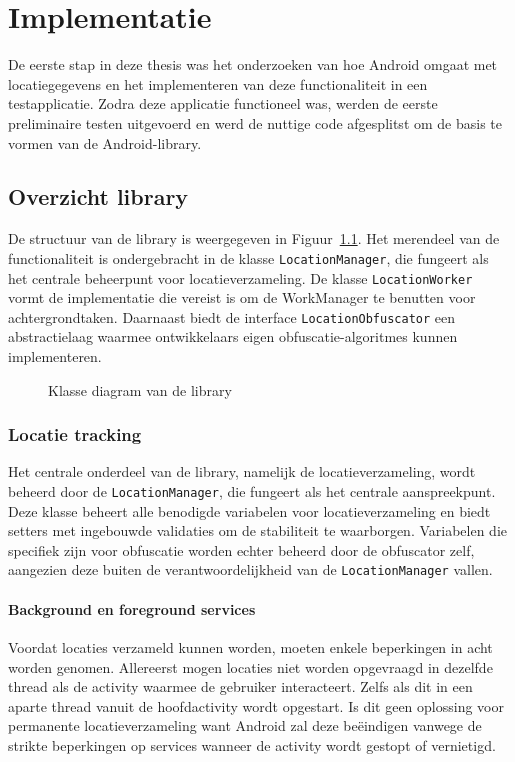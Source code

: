 \chapter{Implementatie} \label{chap:implementatie}
De eerste stap in deze thesis was het onderzoeken van hoe Android omgaat met locatiegegevens en het implementeren van deze functionaliteit in een testapplicatie. Zodra deze applicatie functioneel was, werden de eerste preliminaire testen uitgevoerd en werd de nuttige code afgesplitst om de basis te vormen van de Android-library.
\section{Overzicht library}
De structuur van de library is weergegeven in Figuur~\ref{fig:uml_library}. Het merendeel van de functionaliteit is ondergebracht in de klasse \texttt{LocationManager}, die fungeert als het centrale beheerpunt voor locatieverzameling. De klasse \texttt{LocationWorker} vormt de implementatie die vereist is om de WorkManager te benutten voor achtergrondtaken. Daarnaast biedt de interface \texttt{LocationObfuscator} een abstractielaag waarmee ontwikkelaars eigen obfuscatie-algoritmes kunnen implementeren.
\begin{figure}
    \centering
    
    \caption{Klasse diagram van de library}
    \label{fig:uml_library}
\end{figure}
\subsection{Locatie tracking}
Het centrale onderdeel van de library, namelijk de locatieverzameling, wordt beheerd door de \texttt{LocationManager}, die fungeert als het centrale aanspreekpunt. Deze klasse beheert alle benodigde variabelen voor locatieverzameling en biedt setters met ingebouwde validaties om de stabiliteit te waarborgen. Variabelen die specifiek zijn voor obfuscatie worden echter beheerd door de obfuscator zelf, aangezien deze buiten de verantwoordelijkheid van de \texttt{LocationManager} vallen.

\subsubsection{Background en foreground services}
Voordat locaties verzameld kunnen worden, moeten enkele beperkingen in acht worden genomen. Allereerst mogen locaties niet worden opgevraagd in dezelfde thread als de activity waarmee de gebruiker interacteert. 
Zelfs als dit in een aparte thread vanuit de hoofdactivity wordt opgestart. Is dit geen oplossing voor permanente locatieverzameling want Android zal deze beëindigen vanwege de strikte beperkingen op services wanneer de activity wordt gestopt of vernietigd.

